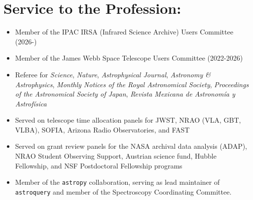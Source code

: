 
\begin{minipage}{\textwidth}
\setlength{\extrarowheight}{4pt}
\section*{Service to the Profession:}
\vspace{-10pt}
\begin{itemize}
\itemsep-3pt
        
    \item Member of the IPAC IRSA (Infrared Science Archive) Users Committee (2026-)
    \item Member of the James Webb Space Telescope Users Committee (2022-2026)
    \item Referee for 
            \textit{Science},
            \textit{Nature},
            \textit{Astrophysical Journal},
            \textit{Astronomy \& Astrophysics},
            \textit{Monthly Notices of the Royal Astronomical Society},
            \textit{Proceedings of the Astronomical Society of Japan},
            \textit{Revista Mexicana de Astronom{\'i}a y Astrof{\'i}sica}
    \item Served on telescope time allocation panels for JWST, NRAO (VLA, GBT,
        VLBA), SOFIA, Arizona Radio Observatories, and FAST
    \item Served on grant review panels for the NASA archival data analysis (ADAP), 
        NRAO Student Observing Support,
        Austrian science fund,
        Hubble Fellowship,
        and NSF Postdoctoral Fellowship programs
    \item Member of the \texttt{astropy} collaboration, serving as lead maintainer
        of \texttt{astroquery} and member of the Spectroscopy Coordinating Committee.
\end{itemize}


\end{minipage}

